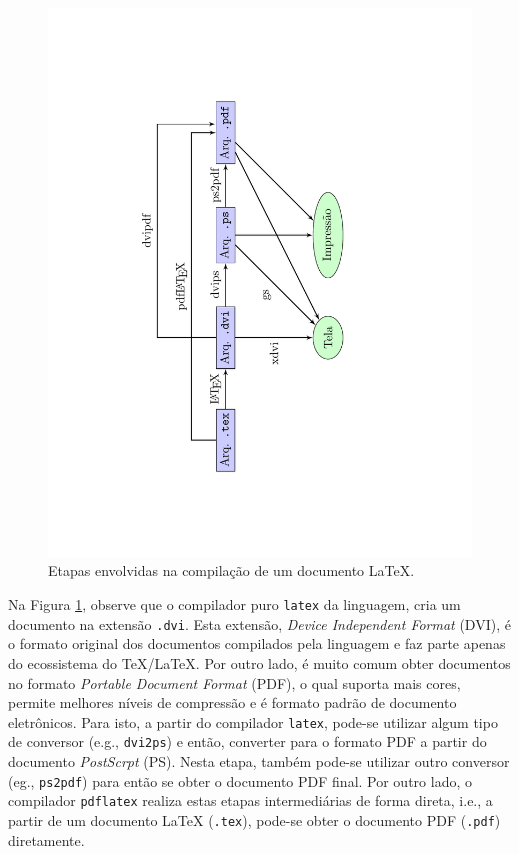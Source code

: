 \begin{figure}[H]
\caption{Etapas envolvidas na compilação de um documento \LaTeX{}.}
\vspace{6mm}
    \begin{center}
        \includegraphics[scale=0.6,angle=-90,trim={4.5cm 1cm 6cm 1cm},clip]{./docs/figs/diagramacomp2.pdf}
    \end{center}
\vspace{4mm}
\label{fig:complatex}
\end{figure}

Na Figura \ref{fig:complatex}, observe que o compilador puro {\tt latex} da linguagem, cria um documento na extensão {\tt .dvi}. Esta extensão, \textit{Device Independent Format} (DVI), é o formato original dos documentos compilados pela linguagem e faz parte apenas do ecossistema do \TeX{}/\LaTeX{}. Por outro lado, é muito comum obter documentos no formato \textit{Portable Document Format} (PDF), o qual suporta mais cores, permite melhores níveis de compressão e é formato padrão de documento eletrônicos. Para isto, a partir do compilador {\tt latex}, pode-se utilizar algum tipo de conversor (e.g., {\tt dvi2ps}) e então, converter para o formato PDF a partir do documento \textit{PostScrpt} (PS). Nesta etapa, também pode-se utilizar outro conversor (eg., {\tt ps2pdf}) para então se obter o documento PDF final. Por outro lado, o compilador {\tt pdflatex} realiza estas etapas intermediárias de forma direta, i.e., a partir de um documento \LaTeX{} ({\tt .tex}), pode-se obter o documento PDF ({\tt .pdf}) diretamente. 

